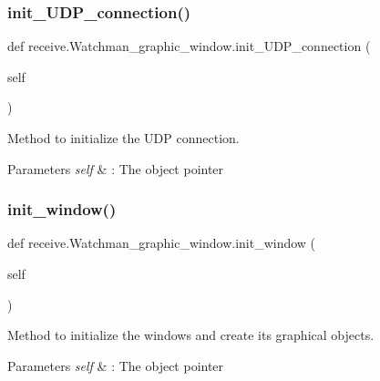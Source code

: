 \subsubsection{\texorpdfstring{init\_UDP\_connection()}{init\_UDP\_connection()}}
{\footnotesize\ttfamily def receive.\+Watchman\+\_\+graphic\+\_\+window.\+init\+\_\+\+U\+D\+P\+\_\+connection (\begin{DoxyParamCaption}\item[{}]{self }\end{DoxyParamCaption})}



Method to initialize the U\+DP connection. 


\begin{DoxyParams}{Parameters}
{\em self} & \+: The object pointer \\
\hline
\end{DoxyParams}
\mbox{\label{classreceive_1_1_watchman__graphic__window_a784cc76bfc1b70575c6fda548c3ca8b7}} 
\subsubsection{\texorpdfstring{init\_window()}{init\_window()}}
{\footnotesize\ttfamily def receive.\+Watchman\+\_\+graphic\+\_\+window.\+init\+\_\+window (\begin{DoxyParamCaption}\item[{}]{self }\end{DoxyParamCaption})}



Method to initialize the windows and create its graphical objects. 


\begin{DoxyParams}{Parameters}
{\em self} & \+: The object pointer \\
\hline
\end{DoxyParams}
\mbox{\label{classreceive_1_1_watchman__graphic__window_ab2f6066c7bc853a9acaecdcb19b91b55}} 
